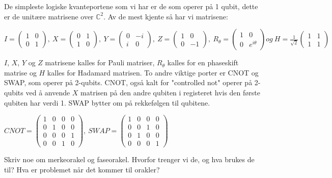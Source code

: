         De simpleste logiske kvanteportene som vi har er de som operer på 1 qubit, dette er de unitære matrisene over $\mathbb{C}^2$. Av de mest kjente så har vi matrisene:
        \begin{center}
            \begin{math}
                I = \begin{pmatrix}
                    1 & 0 \\ 0 & 1
                \end{pmatrix},\ X = \begin{pmatrix}
                    0 & 1 \\ 1 & 0
                \end{pmatrix},\ Y = \begin{pmatrix}
                    0 & -i \\ i & 0
                \end{pmatrix},\ Z = \begin{pmatrix}
                    1 & 0 \\ 0 & -1
                \end{pmatrix},\ R_\theta = \begin{pmatrix}
                    1 & 0 \\ 0 & e^{i\theta}
                \end{pmatrix} og\ H = \frac{1}{\sqrt{2}}\begin{pmatrix}
                    1 & 1 \\ 1 & 1
                \end{pmatrix}
            \end{math}
        \end{center}

        $I$, $X$, $Y$ og $Z$ matrisene kalles for Pauli matriser, $R_\theta$ kalles for en phaseskift matrise og $H$ kalles for Hadamard matrisen. To andre viktige porter er CNOT og SWAP, som operer på 2-qubits. CNOT, også kalt for "controlled not" operer på 2-qubits ved å anvende $X$ matrisen på den andre qubiten i registeret hvis den første qubiten har verdi 1. SWAP bytter om på rekkefølgen til qubitene.
        \begin{center}
            \begin{math}
                CNOT = \begin{pmatrix}
                    1 & 0 & 0 & 0 \\
                    0 & 1 & 0 & 0 \\
                    0 & 0 & 0 & 1 \\
                    0 & 0 & 1 & 0
                \end{pmatrix},\ SWAP = \begin{pmatrix}
                    1 & 0 & 0 & 0 \\
                    0 & 0 & 1 & 0 \\
                    0 & 1 & 0 & 0 \\
                    0 & 0 & 0 & 1
                \end{pmatrix}
            \end{math}
        \end{center}

        Skriv noe om merkeorakel og faseorakel. Hvorfor trenger vi de, og hva brukes de til? Hva er problemet når det kommer til orakler?